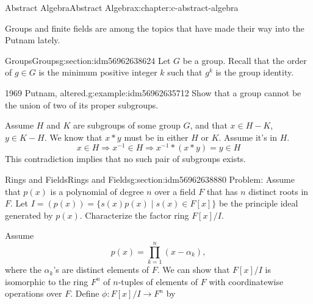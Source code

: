 \documentclass[twoside,10pt,]{book}
\numberwithin{equation}{section}
\begin{document}
%
%
\typeout{************************************************}
\typeout{************************************************}
%
\begin{chapterptx}{Abstract Algebra}{}{Abstract Algebra}{}{}{x:chapter:c-abstract-algebra}
\begin{introduction}{}%
Groups and finite fields are among the topics that have made their way into the Putnam lately.%
\end{introduction}%
%
%
\typeout{************************************************}
\typeout{************************************************}
%
\begin{sectionptx}{Groups}{}{Groups}{}{}{g:section:idm56962638624}
Let \(G\) be a group. Recall that the order of  \(g \in G\) is the minimum positive integer \(k\) such that \(g^k\) is the group identity.%
\begin{example}{1969 Putnam, altered.}{g:example:idm56962635712}%
Show that a group cannot be the union of two of its proper subgroups.%
\par
Assume \(H\) and \(K\) are subgroups of some group \(G\), and that \(x \in H-K\), \(y \in K-H\).  We know that \(x*y\) must be in either \(H\) or \(K\).  Assume it's in \(H\).%
\begin{equation*}
x \in H \Rightarrow x^{-1} \in H \Rightarrow x^{-1}*(x*y) = y \in H
\end{equation*}
This contradiction implies that no such pair of subgroups exists.%
\end{example}
\end{sectionptx}
%
%
\typeout{************************************************}
\typeout{************************************************}
%
\begin{sectionptx}{Rings and Fields}{}{Rings and Fields}{}{}{g:section:idm56962638880}
Problem: Assume that \(p(x)\) is a polynomial of degree \(n\) over a field \(F\) that has \(n\) distinct roots in \(F\). Let \(I=(p(x)) = \{s(x)p(x) \mid s(x)\in F[x]\}\) be the principle ideal generated by \(p(x)\).  Characterize the factor ring \(F[x]/I\).%
\par
Assume%
\begin{equation*}
p(x)= \prod_{k=1}^n (x-\alpha_k),
\end{equation*}
where the \(\alpha_k\)'s are distinct elements of \(F\). We can show that \(F[x]/I\) is isomorphic to the ring \(F^n\) of \(n\)-tuples of elements of \(F\) with coordinatewise operations over \(F\).  Define \(\phi:F[x]/I \rightarrow F^n\) by%

\end{sectionptx}
\end{chapterptx}
\end{document}
